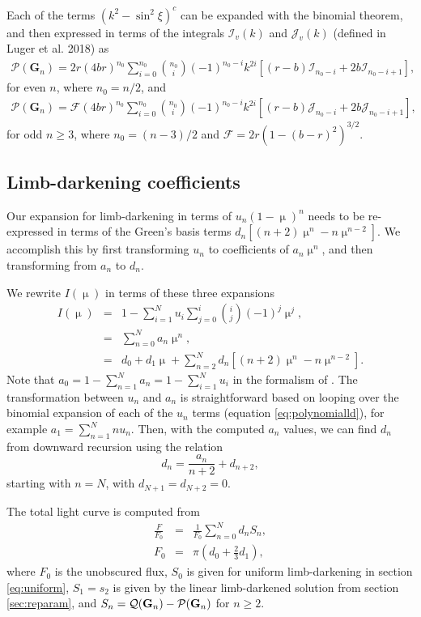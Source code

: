 \documentclass[modern]{aastex61}
\begin{document}
Each of the terms $(k^2-\sin^2\xi)^c$ can be expanded with the binomial theorem,
and then expressed in terms of the integrals $\mathcal{I}_v(k)$ and $\mathcal{J}_v(k)$ 
(defined in Luger et al. 2018) as
\begin{eqnarray}
\mathcal{P}(\mathbf{G}_n)
= 2r(4br)^{n_0} \sum_{i=0}^{n_0} \binom{n_0}{i}(-1)^{n_0-i} k^{2i} \left[(r-b)\mathcal{I}_{n_0-i} + 2b \mathcal{I}_{n_0-i+1}\right],
\end{eqnarray}
for even $n$, where $n_0 = n/2$, and
\begin{eqnarray}
\mathcal{P}(\mathbf{G}_n) 
= \mathcal{F}(4br)^{n_0} \sum_{i=0}^{n_0} \binom{n_0}{i} (-1)^{n_0-i} k^{2i} \left[(r-b)\mathcal{J}_{n_0-i} + 2b \mathcal{J}_{n_0-i+1}\right],
\end{eqnarray}
for odd $n \ge 3$, where $n_0 = (n-3)/2$ and
 $\mathcal{F} = 2r(1-(b-r)^2)^{3/2}$.

\subsection{Limb-darkening coefficients}

Our expansion for limb-darkening in terms of $u_n(1-\upmu)^n$ needs to
be re-expressed in terms of the Green's basis terms $d_n \left[(n+2)\upmu^n -n \upmu^{n-2}\right]$.
We accomplish this by first transforming $u_n$ to coefficients of $a_n \upmu^n$,
and then transforming from $a_n$ to $d_n$.

We rewrite $I(\upmu)$ in terms of these three expansions
\begin{eqnarray}
I(\upmu) &=& 1 - \sum_{i=1}^N u_i \sum_{j=0}^i \binom{i}{j} (-1)^j \upmu^j,\\
&=& \sum_{n=0}^N a_n \upmu^n,\\
&=& d_0 + d_1 \upmu + \sum_{n=2}^N d_n \left[(n+2)\upmu^n -n \upmu^{n-2}\right].
\end{eqnarray}
Note that $a_0= 1-\sum_{n=1}^N a_n = 1 - \sum_{i=1}^N u_i$ in the formalism of \citet{Gimenez2006}.
The transformation between $u_n$ and $a_n$ is straightforward based on
looping over the binomial expansion of each of the $u_n$ terms (equation \ref{eq:polynomialld}),
for example $a_1 = \sum_{n=1}^N n u_n$.
Then, with the computed $a_n$ values, we can find $d_n$ from downward recursion
using the relation
\begin{equation}
d_n = \frac{a_n}{n+2} + d_{n+2},
\end{equation}
starting with $n=N$, with $d_{N+1}=d_{N+2}=0$.

The total light curve is computed from
\begin{eqnarray}
\frac{F}{F_0} &=& \frac{1}{F_0}\sum_{n=0}^N d_n S_n,\\
F_0 &=& \pi(d_0+ \tfrac{2}{3} d_1),
\end{eqnarray}
where $F_0$ is the unobscured flux, $S_0$ is given for uniform limb-darkening
in section \ref{eq:uniform}, $S_1=s_2$ is given by the linear limb-darkened 
solution from section \ref{sec:reparam}, and  $S_n = \mathcal{Q}({\mathbf{G}}_n) 
- \mathcal{P}({\mathbf{G}}_n)$ for $n \ge 2$.
\end{document}
